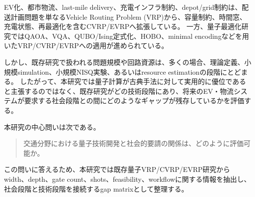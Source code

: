 EV化、都市物流、last-mile delivery、充電インフラ制約、depot/grid制約は、配送計画問題を単なるVehicle Routing Problem (VRP)から、容量制約、時間窓、充電状態、再最適化を含むCVRP/EVRPへ拡張している。
一方、量子最適化研究ではQAOA、VQA、QUBO/Ising定式化、HOBO、minimal encodingなどを用いたVRP/CVRP/EVRPへの適用が進められている。

しかし、既存研究で扱われる問題規模や回路資源は、多くの場合、理論定義、小規模simulation、小規模NISQ実験、あるいはresource estimationの段階にとどまる。
したがって、本研究では量子計算が古典手法に対して実用的に優位であると主張するのではなく、既存研究がどの技術段階にあり、将来のEV・物流システムが要求する社会段階との間にどのようなギャップが残存しているかを評価する。

本研究の中心問いは次である。

\begin{quote}
交通分野における量子技術開発と社会的要請の関係は、どのように評価可能か。
\end{quote}

この問いに答えるため、本研究では既存量子VRP/CVRP/EVRP研究からwidth、depth、gate count、shots、feasibility、workflowに関する情報を抽出し、社会段階と技術段階を接続するgap matrixとして整理する。
